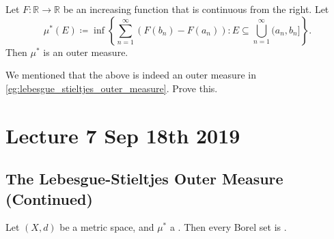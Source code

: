 \documentclass[notoc,notitlepage]{tufte-book}
\begin{document}
\begin{defn}\label{defn:lebesgue_stieltjes_outer_measure}
  Let $F : \mathbb{R} \to \mathbb{R}$ be an increasing function
  that is continuous from the right.
  Let
  \begin{equation*}
    \mu^*(E) \coloneqq \inf \left\{ 
      \sum_{n=1}^{\infty} ( F(b_n) - F(a_n) )
      : E \subseteq \bigcup_{n=1}^{\infty} (a_n, b_n]
    \right\}.
  \end{equation*}
  Then $\mu^*$ is an outer measure.
\end{defn}

\begin{ex}
  We mentioned that the above is indeed an outer measure in
  \cref{eg:lebesgue_stieltjes_outer_measure}.
  Prove this.
\end{ex}



\chapter{Lecture 7 Sep 18th 2019}%
\label{chp:lecture_7_sep_18th_2019}

\section{The Lebesgue-Stieltjes Outer Measure (Continued)}%
\label{sec:the_lebesgue_stieltjes_outer_measure_continued}

\begin{thm}\label{thm:caratheodory_s_second_theorem}
  Let $(X, d)$ be a metric space,
  and $\mu^*$ a .
  Then every Borel set is .
\end{thm}
\end{document}
